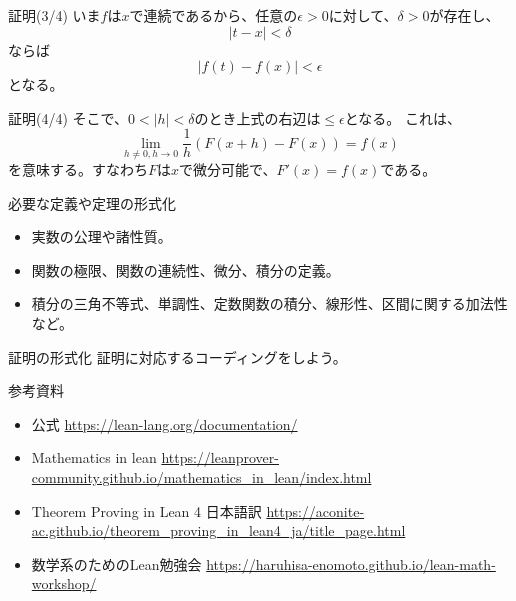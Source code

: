 \documentclass[unicode,12pt]{beamer}%
\begin{document}
\begin{frame}{証明(3/4)}
  いま$f$は$x$で連続であるから、任意の$\epsilon>0$に対して、$\delta>0$が存在し、
  $$
  \lvert t-x\rvert<\delta
  $$
  ならば
  $$
  \lvert f(t)-f(x)\rvert<\epsilon
  $$
  となる。
\end{frame}

\begin{frame}{証明(4/4)}
  そこで、$0<\lvert h\rvert <\delta$のとき上式の右辺は$\leq\epsilon$となる。
  これは、
  $$
  \lim_{h\neq0,h\to0}\frac{1}{h}(F(x+h)-F(x))=f(x)
  $$
  を意味する。すなわち$F$は$x$で微分可能で、$F'(x)=f(x)$である。
\end{frame}

\begin{frame}{必要な定義や定理の形式化}
  \begin{itemize}
    \item 実数の公理や諸性質。
    \item 関数の極限、関数の連続性、微分、積分の定義。
    \item 積分の三角不等式、単調性、定数関数の積分、線形性、区間に関する加法性など。
  \end{itemize}
\end{frame}

\begin{frame}{証明の形式化}
  証明に対応するコーディングをしよう。
\end{frame}

\begin{frame}{参考資料}
  \begin{itemize}
    \item 公式 \url{https://lean-lang.org/documentation/}
    \item Mathematics in lean \url{https://leanprover-community.github.io/mathematics_in_lean/index.html}
    \item Theorem Proving in Lean 4 日本語訳 \url{https://aconite-ac.github.io/theorem_proving_in_lean4_ja/title_page.html}
    \item 数学系のためのLean勉強会 \url{https://haruhisa-enomoto.github.io/lean-math-workshop/}
  \end{itemize}
\end{frame}
\end{document}

